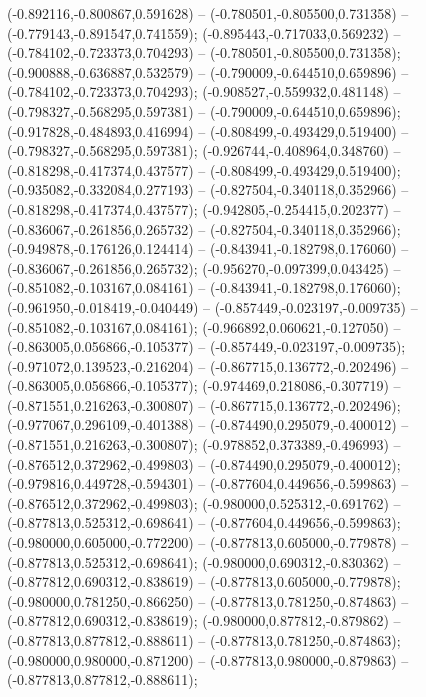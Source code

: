  (-0.892116,-0.800867,0.591628) -- (-0.780501,-0.805500,0.731358) -- (-0.779143,-0.891547,0.741559);
 (-0.895443,-0.717033,0.569232) -- (-0.784102,-0.723373,0.704293) -- (-0.780501,-0.805500,0.731358);
 (-0.900888,-0.636887,0.532579) -- (-0.790009,-0.644510,0.659896) -- (-0.784102,-0.723373,0.704293);
 (-0.908527,-0.559932,0.481148) -- (-0.798327,-0.568295,0.597381) -- (-0.790009,-0.644510,0.659896);
 (-0.917828,-0.484893,0.416994) -- (-0.808499,-0.493429,0.519400) -- (-0.798327,-0.568295,0.597381);
 (-0.926744,-0.408964,0.348760) -- (-0.818298,-0.417374,0.437577) -- (-0.808499,-0.493429,0.519400);
 (-0.935082,-0.332084,0.277193) -- (-0.827504,-0.340118,0.352966) -- (-0.818298,-0.417374,0.437577);
 (-0.942805,-0.254415,0.202377) -- (-0.836067,-0.261856,0.265732) -- (-0.827504,-0.340118,0.352966);
 (-0.949878,-0.176126,0.124414) -- (-0.843941,-0.182798,0.176060) -- (-0.836067,-0.261856,0.265732);
 (-0.956270,-0.097399,0.043425) -- (-0.851082,-0.103167,0.084161) -- (-0.843941,-0.182798,0.176060);
 (-0.961950,-0.018419,-0.040449) -- (-0.857449,-0.023197,-0.009735) -- (-0.851082,-0.103167,0.084161);
 (-0.966892,0.060621,-0.127050) -- (-0.863005,0.056866,-0.105377) -- (-0.857449,-0.023197,-0.009735);
 (-0.971072,0.139523,-0.216204) -- (-0.867715,0.136772,-0.202496) -- (-0.863005,0.056866,-0.105377);
 (-0.974469,0.218086,-0.307719) -- (-0.871551,0.216263,-0.300807) -- (-0.867715,0.136772,-0.202496);
 (-0.977067,0.296109,-0.401388) -- (-0.874490,0.295079,-0.400012) -- (-0.871551,0.216263,-0.300807);
 (-0.978852,0.373389,-0.496993) -- (-0.876512,0.372962,-0.499803) -- (-0.874490,0.295079,-0.400012);
 (-0.979816,0.449728,-0.594301) -- (-0.877604,0.449656,-0.599863) -- (-0.876512,0.372962,-0.499803);
 (-0.980000,0.525312,-0.691762) -- (-0.877813,0.525312,-0.698641) -- (-0.877604,0.449656,-0.599863);
 (-0.980000,0.605000,-0.772200) -- (-0.877813,0.605000,-0.779878) -- (-0.877813,0.525312,-0.698641);
 (-0.980000,0.690312,-0.830362) -- (-0.877812,0.690312,-0.838619) -- (-0.877813,0.605000,-0.779878);
 (-0.980000,0.781250,-0.866250) -- (-0.877813,0.781250,-0.874863) -- (-0.877812,0.690312,-0.838619);
 (-0.980000,0.877812,-0.879862) -- (-0.877813,0.877812,-0.888611) -- (-0.877813,0.781250,-0.874863);
 (-0.980000,0.980000,-0.871200) -- (-0.877813,0.980000,-0.879863) -- (-0.877813,0.877812,-0.888611);
